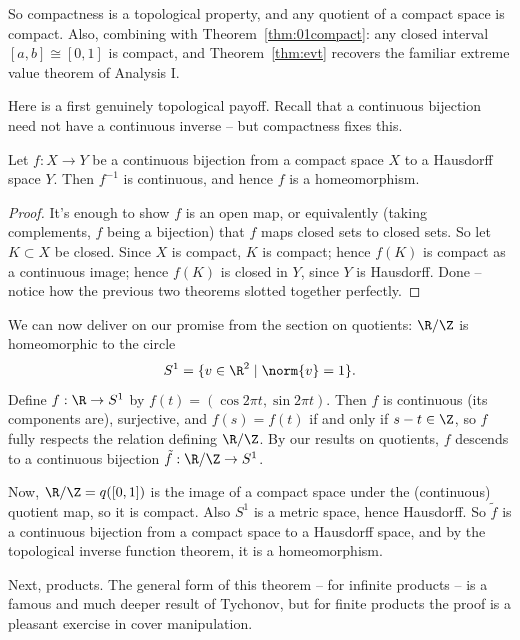 So compactness is a topological property, and any quotient of a compact space is compact. Also, combining with Theorem~\ref{thm:01compact}: any closed interval $[a, b] \cong [0, 1]$ is compact, and Theorem~\ref{thm:evt} recovers the familiar extreme value theorem of Analysis I.

Here is a first genuinely topological payoff. Recall that a continuous bijection need not have a continuous inverse -- but compactness fixes this.

\begin{theorem}\label{thm:topift}
    Let $f: X \rightarrow Y$ be a continuous bijection from a compact space $X$ to a Hausdorff space $Y$. Then $f^{-1}$ is continuous, and hence $f$ is a homeomorphism.
\end{theorem}
\begin{proof}
    It's enough to show $f$ is an open map, or equivalently (taking complements, $f$ being a bijection) that $f$ maps closed sets to closed sets. So let $K \subset X$ be closed. Since $X$ is compact, $K$ is compact; hence $f(K)$ is compact as a continuous image; hence $f(K)$ is closed in $Y$, since $Y$ is Hausdorff. Done -- notice how the previous two theorems slotted together perfectly.
\end{proof}

\begin{example}[$\R/\Z \cong S^1$]
    We can now deliver on our promise from the section on quotients: $\R/\Z$ is homeomorphic to the circle
    $$
    S^1 = \{v \in \R^2 \mid \norm{v} = 1\}.
    $$
    Define $f: \R \rightarrow S^1$ by $f(t) = (\cos 2\pi t, \sin 2\pi t)$. Then $f$ is continuous (its components are), surjective, and $f(s) = f(t)$ if and only if $s - t \in \Z$, so $f$ fully respects the relation defining $\R/\Z$. By our results on quotients, $f$ descends to a continuous bijection $\tilde{f}: \R/\Z \rightarrow S^1$.

    Now, $\R/\Z = q([0, 1])$ is the image of a compact space under the (continuous) quotient map, so it is compact. Also $S^1$ is a metric space, hence Hausdorff. So $\tilde{f}$ is a continuous bijection from a compact space to a Hausdorff space, and by the topological inverse function theorem, it is a homeomorphism.
\end{example}

Next, products. The general form of this theorem -- for infinite products -- is a famous and much deeper result of Tychonov, but for finite products the proof is a pleasant exercise in cover manipulation.

